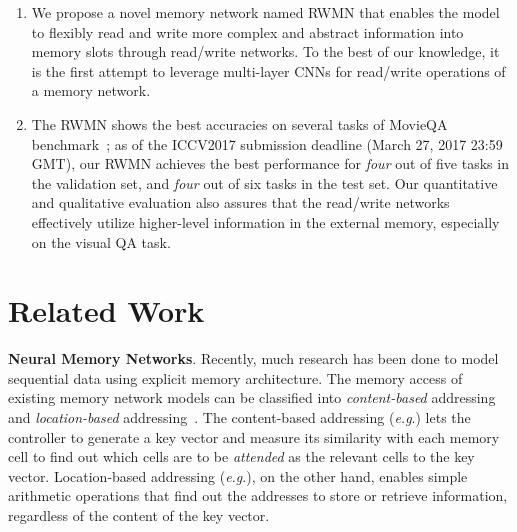 \documentclass[10pt,twocolumn,letterpaper]{article}
\makeatletter
\theoremstyle{nonumberplain}
\DeclareRobustCommand\onedot{\futurelet\@let@token\@onedot}
\def\onedot{.\@\xspace}
\def\eg{\emph{e.g}\onedot} \def\Eg{\emph{E.g}\onedot}
\makeatother
\begin{document}
\begin{enumerate}
\item We propose a novel memory network named RWMN  that enables the model to flexibly read and write more complex and abstract information into memory slots through read/write networks. 
To the best of our knowledge, it is the first attempt to leverage multi-layer CNNs for read/write operations of a memory network. 

\item The RWMN shows the best accuracies on several tasks of MovieQA benchmark~\cite{tapaswi2016movieqa}; as of the ICCV2017 submission deadline (March 27, 2017 23:59 GMT), our RWMN achieves the best performance for \textit{four} out of five tasks in the validation set, and \textit{four} out of six tasks in the test set.
Our quantitative and qualitative evaluation also assures that the read/write networks effectively utilize higher-level information in the external memory, especially on the visual QA task. \end{enumerate}



\section{Related Work}
\label{sec:related_work}

\textbf{Neural Memory Networks}.
Recently, much research has been done to model sequential data using explicit memory architecture. 
The memory access of existing memory network models can be classified into \textit{content-based} addressing and \textit{location-based} addressing~\cite{graves2014neural}. 
The content-based addressing (\eg\cite{graves2016hybrid,weston2014memory, miller2016key}) lets the controller to generate a key vector and measure its similarity with each memory cell to find out which cells are to be \textit{attended} as the relevant cells to the key vector.
Location-based addressing (\eg\cite{graves2014neural}), on the other hand, enables simple arithmetic operations that find out the addresses to store or retrieve information, regardless of the content of the key vector.
\end{document}
